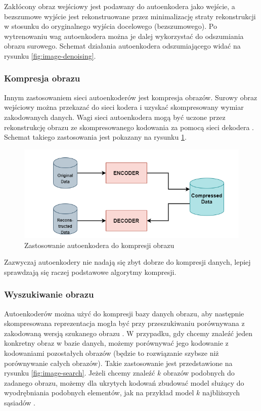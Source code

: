 \documentclass[12pt]{mwbk}
\theoremstyle{plain}
\theoremstyle{definition}
\theoremstyle{remark}
\newcommand\zrodlo[1]{\par\vspace{-3mm}{\small\textit{Źródło: }#1 }}
\begin{document}
Zakłócony obraz wejściowy jest podawany do autoenkodera jako wejście, a bezszumowe wyjście jest rekonstruowane przez minimalizację straty rekonstrukcji w stosunku do oryginalnego wyjścia docelowego (bezszumowego). Po wytrenowaniu wag autoenkodera można je dalej wykorzystać do odszumiania obrazu surowego. Schemat działania autoenkodera odszumiającego widać na rysunku \ref{fig:image-denoising}.

\subsubsection{Kompresja obrazu}

Innym zastosowaniem sieci autoenkoderów jest kompresja obrazów. Surowy obraz wejściowy można przekazać do sieci kodera i uzyskać skompresowany wymiar zakodowanych danych. Wagi sieci autoenkodera mogą być uczone przez rekonstrukcję obrazu ze skompresowanego kodowania za pomocą sieci dekodera \cite{kumar}. Schemat takiego zastosowania jest pokazany na rysunku \ref{fig:image-compression}.

\begin{figure}[!h]
	\centering
	\includegraphics[width=0.8\linewidth]{rys/image_compression.png}
	\caption{Zastosowanie autoenkodera do kompresji obrazu}
	\zrodlo{\cite{kumar}}
	\label{fig:image-compression}
\end{figure}

Zazwyczaj autoenkodery nie nadają się zbyt dobrze do kompresji danych, lepiej sprawdzają się raczej podstawowe algorytmy kompresji.

\newpage

\subsubsection{Wyszukiwanie obrazu}

Autoenkoderów można użyć do kompresji bazy danych obrazu, aby następnie skompresowana reprezentacja mogła być przy przeszukiwaniu porównywana z zakodowaną wersją szukanego obrazu \cite{kumar}. W przypadku, gdy chcemy znaleźć jeden konkretny obraz w bazie danych, możemy porównywać jego kodowanie z kodowaniami pozostałych obrazów (będzie to rozwiązanie szybsze niż porównywanie całych obrazów). Takie zastosowanie jest przedstawione na rysunku \ref{fig:image-search}. Jeżeli chcemy znaleźć $k$ obrazów podobnych do zadanego obrazu, możemy dla ukrytych kodowań zbudować model służący do wyodrębniania podobnych elementów, jak na przykład model $k$ najbliższych sąsiadów \cite{wong}.
\end{document}

